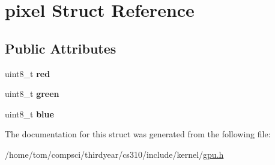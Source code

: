 \hypertarget{structpixel}{}\section{pixel Struct Reference}
\label{structpixel}
\subsection*{Public Attributes}
\begin{DoxyCompactItemize}
\item 
\mbox{\label{structpixel_a7fa0011ed5f9c490ea48c2f79bfd9088}} 
uint8\+\_\+t {\bfseries red}
\item 
\mbox{\label{structpixel_a30ee7ee574d3cedbb9c7a377391de730}} 
uint8\+\_\+t {\bfseries green}
\item 
\mbox{\label{structpixel_a4677f6edf51b616626c23c7080d7db67}} 
uint8\+\_\+t {\bfseries blue}
\end{DoxyCompactItemize}


The documentation for this struct was generated from the following file\+:\begin{DoxyCompactItemize}
\item 
/home/tom/compsci/thirdyear/cs310/include/kernel/\mbox{\hyperlink{gpu_8h}{gpu.\+h}}\end{DoxyCompactItemize}
